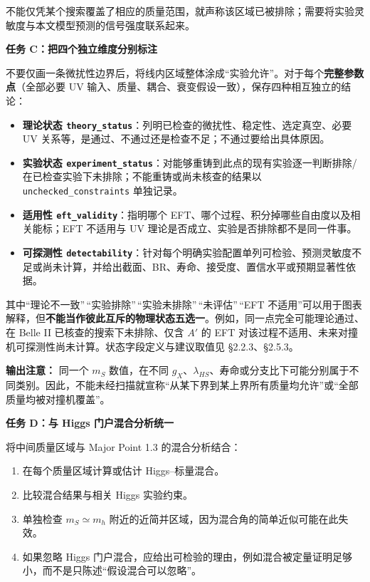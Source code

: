 \documentclass[
  chinese,
  UTF8]{ctexart}
\providecommand{\tightlist}{%
  \setlength{\itemsep}{0pt}\setlength{\parskip}{0pt}}
\begin{document}
不能仅凭某个搜索覆盖了相应的质量范围，就声称该区域已被排除；需要将实验灵敏度与本文模型预测的信号强度联系起来。

\textbf{任务 C：把四个独立维度分别标注}

不要仅画一条微扰性边界后，将线内区域整体涂成``实验允许''。对于每个\textbf{完整参数点}（全部必要
UV 输入、质量、耦合、衰变假设一致），保存四种相互独立的结论：

\begin{itemize}
\tightlist
\item
  \textbf{理论状态
  \texttt{theory\_status}}：列明已检查的微扰性、稳定性、选定真空、必要
  UV 关系等，是通过、不通过还是检查不足；不通过要给出具体原因。
\item
  \textbf{实验状态
  \texttt{experiment\_status}}：对能够重铸到此点的现有实验逐一判断排除/在已检查实验下未排除；不能重铸或尚未核查的结果以
  \texttt{unchecked\_constraints} 单独记录。
\item
  \textbf{适用性 \texttt{eft\_validity}}：指明哪个
  EFT、哪个过程、积分掉哪些自由度以及相关能标；EFT 不适用与 UV
  理论是否成立、实验是否排除都不是同一件事。
\item
  \textbf{可探测性
  \texttt{detectability}}：针对每个明确实验配置单列可检验、预测灵敏度不足或尚未计算，并给出截面、BR、寿命、接受度、置信水平或预期显著性依据。
\end{itemize}

其中``理论不一致''\,``实验排除''\,``实验未排除''\,``未评估''\,``EFT
不适用''可以用于图表解释，但\textbf{不能当作彼此互斥的物理状态五选一}。例如，同一点完全可能理论通过、在
Belle II 已核查的搜索下未排除、仅含 \(A'\) 的 EFT
对该过程不适用、未来对撞机可探测性尚未计算。状态字段定义与建议取值见
§2.2.3、§2.5.3。

\textbf{输出注意：} 同一个 \(m_S\) 数值，在不同
\(g_X\)、\(\lambda_{HS}\)、寿命或分支比下可能分别属于不同类别。因此，不能未经扫描就宣称``从某下界到某上界所有质量均允许''或``全部质量均被对撞机覆盖''。

\textbf{任务 D：与 Higgs 门户混合分析统一}

将中间质量区域与 Major Point 1.3 的混合分析结合：

\begin{enumerate}
\def\labelenumi{\arabic{enumi}.}
\tightlist
\item
  在每个质量区域计算或估计 Higgs--标量混合。
\item
  比较混合结果与相关 Higgs 实验约束。
\item
  单独检查 \(m_S\simeq m_h\)
  附近的近简并区域，因为混合角的简单近似可能在此失效。
\item
  如果忽略 Higgs
  门户混合，应给出可检验的理由，例如混合被定量证明足够小，而不是只陈述``假设混合可以忽略''。
\end{enumerate}
\end{document}
